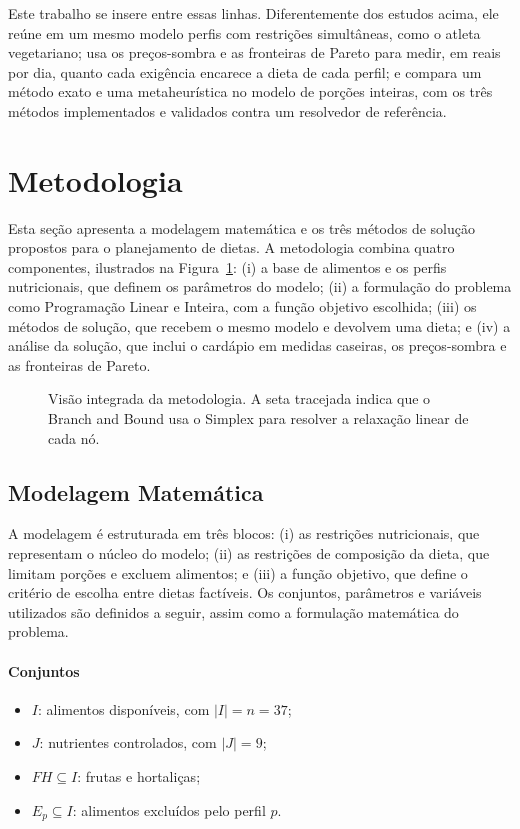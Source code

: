 \documentclass[12pt]{article}
\begin{document}
Este trabalho se insere entre essas linhas. Diferentemente dos estudos acima, ele
reúne em um mesmo modelo perfis com restrições simultâneas, como o atleta vegetariano;
usa os preços-sombra e as fronteiras de Pareto para medir, em reais por dia, quanto
cada exigência encarece a dieta de cada perfil; e compara um método exato e uma
metaheurística no modelo de porções inteiras, com os três métodos implementados e
validados contra um resolvedor de referência.

\section{Metodologia}\label{sec:metodologia}

Esta seção apresenta a modelagem matemática e os três métodos de solução propostos
para o planejamento de dietas. A metodologia combina quatro componentes, ilustrados na
Figura~\ref{fig:visao}: (i) a base de alimentos e os perfis nutricionais, que definem
os parâmetros do modelo; (ii) a formulação do problema como Programação Linear e
Inteira, com a função objetivo escolhida; (iii) os métodos de solução, que recebem o
mesmo modelo e devolvem uma dieta; e (iv) a análise da solução, que inclui o cardápio
em medidas caseiras, os preços-sombra e as fronteiras de Pareto.

\begin{figure}[ht]
\centering

\caption{Visão integrada da metodologia. A seta tracejada indica que o Branch and Bound
usa o Simplex para resolver a relaxação linear de cada nó.}\label{fig:visao}
\end{figure}

\subsection{Modelagem Matemática}

A modelagem é estruturada em três blocos: (i) as restrições nutricionais, que
representam o núcleo do modelo; (ii) as restrições de composição da dieta, que limitam
porções e excluem alimentos; e (iii) a função objetivo, que define o critério de
escolha entre dietas factíveis. Os conjuntos, parâmetros e variáveis utilizados são
definidos a seguir, assim como a formulação matemática do problema.

\paragraph{Conjuntos}
\begin{itemize}
  \item $I$: alimentos disponíveis, com $|I| = n = 37$;
  \item $J$: nutrientes controlados, com $|J| = 9$;
  \item $FH \subseteq I$: frutas e hortaliças;
  \item $E_p \subseteq I$: alimentos excluídos pelo perfil $p$.
\end{itemize}
\end{document}
